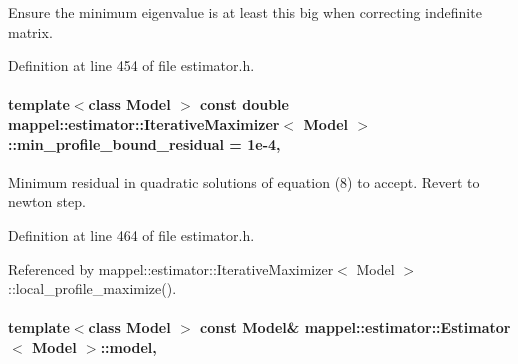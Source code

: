 Ensure the minimum eigenvalue is at least this big when correcting indefinite matrix. 



Definition at line 454 of file estimator.\+h.

\paragraph[{\texorpdfstring{min\+\_\+profile\+\_\+bound\+\_\+residual}{min_profile_bound_residual}}]{\setlength{\rightskip}{0pt plus 5cm}template$<$class Model $>$ const double {\bf mappel\+::estimator\+::\+Iterative\+Maximizer}$<$ Model $>$\+::min\+\_\+profile\+\_\+bound\+\_\+residual = 1e-\/4\hspace{0.3cm}{\ttfamily [static]}, {\ttfamily [protected]}}\hypertarget{classmappel_1_1estimator_1_1IterativeMaximizer_a04b56451448fa004f4ce3da97bfde9ec}{}\label{classmappel_1_1estimator_1_1IterativeMaximizer_a04b56451448fa004f4ce3da97bfde9ec}


Minimum residual in quadratic solutions of equation (8) to accept. Revert to newton step. 



Definition at line 464 of file estimator.\+h.



Referenced by mappel\+::estimator\+::\+Iterative\+Maximizer$<$ Model $>$\+::local\+\_\+profile\+\_\+maximize().

\paragraph[{\texorpdfstring{model}{model}}]{\setlength{\rightskip}{0pt plus 5cm}template$<$class Model $>$ const Model\& {\bf mappel\+::estimator\+::\+Estimator}$<$ Model $>$\+::model\hspace{0.3cm}{\ttfamily [protected]}, {\ttfamily [inherited]}}\hypertarget{classmappel_1_1estimator_1_1Estimator_a2f157410771fb79a20d4d54e505750d0}{}\label{classmappel_1_1estimator_1_1Estimator_a2f157410771fb79a20d4d54e505750d0}


